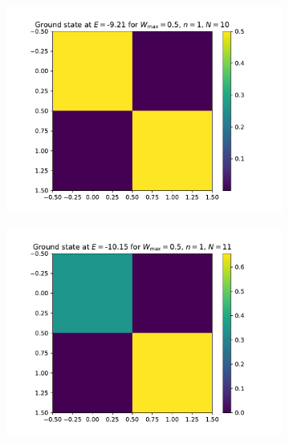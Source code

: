 \documentclass[reprint,amsmath,amssymb,aps,prb]{revtex4-2}
\begin{document}
\begin{figure}[h!]
	\begin{subfigure}[c]{0.3\textwidth}
		\includegraphics[width=\textwidth]{../results/N10_trainingset_groundstate_Wmax0.5.pdf}
	\end{subfigure}
	\begin{subfigure}[c]{0.3\textwidth}
		\includegraphics[width=\textwidth]{../results/N11_trainingset_groundstate_Wmax0.5.pdf}
	\end{subfigure}
	\begin{subfigure}[c]{0.3\textwidth}

\end{subfigure}
\end{figure}
\end{document}
